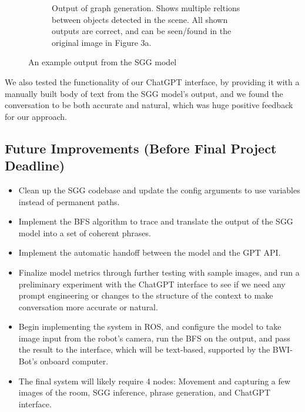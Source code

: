 \documentclass[letterpaper, 10 pt, conference]{ieeeconf}  %
\begin{document}
\begin{figure}
\begin{subfigure}{0.48\textwidth}
            \caption{Output of graph generation. Shows multiple reltions between objects detected in the scene. All shown outputs are correct, and can be seen/found in the original image in Figure 3a.}
            \label{fig:graph}
        \end{subfigure}
        \caption{An example output from the SGG model}
        \label{fig:example}
        
    \end{figure}

    We also tested the functionality of our ChatGPT interface, by providing it with a manually built body of text from the SGG model's output, and we found the conversation to be both accurate and natural, which was huge positive feedback for our approach.

\subsection*{Future Improvements (Before Final Project Deadline)}
    \begin{itemize}
        \item Clean up the SGG codebase and update the config arguments to use variables instead of permanent paths.
        \item Implement the BFS algorithm to trace and translate the output of the SGG model into a set of coherent phrases.
        \item Implement the automatic handoff between the model and the GPT API.
        \item Finalize model metrics through further testing with sample images, and run a preliminary experiment with the ChatGPT interface to see if we need any prompt engineering or changes to the structure of the context to make conversation more accurate or natural.
        \item Begin implementing the system in ROS, and configure the model to take image input from the robot's camera, run the BFS on the output, and pass the result to the interface, which will be text-based, supported by the BWI-Bot's onboard computer.
        \item The final system will likely require 4 nodes: Movement and capturing a few images of the room, SGG inference, phrase generation, and ChatGPT interface.
    \end{itemize}
\end{document}
